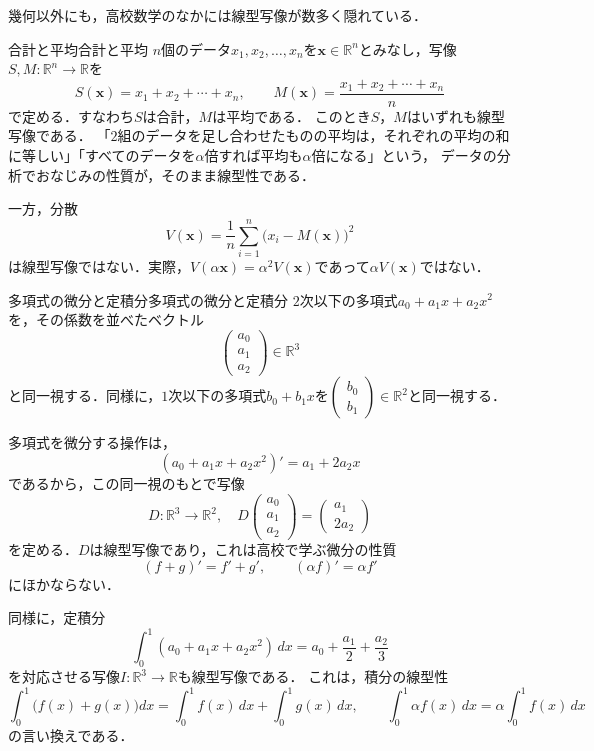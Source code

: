 幾何以外にも，高校数学のなかには線型写像が数多く隠れている．

\begin{example}{合計と平均}{合計と平均}
  $n$個のデータ$x_1, x_2, \dots, x_n$を$\bm{x} \in \mathbb{R}^n$とみなし，写像$S, M \colon \mathbb{R}^n \to \mathbb{R}$を
  \[
    S(\bm{x}) = x_1 + x_2 + \cdots + x_n, \qquad
    M(\bm{x}) = \frac{x_1 + x_2 + \cdots + x_n}{n}
  \]
  で定める．すなわち$S$は合計，$M$は平均である．
  このとき$S$，$M$はいずれも線型写像である．
  「$2$組のデータを足し合わせたものの平均は，それぞれの平均の和に等しい」「すべてのデータを$\alpha$倍すれば平均も$\alpha$倍になる」という，
  データの分析でおなじみの性質が，そのまま線型性である．

  一方，分散
  \[
    V(\bm{x}) = \frac{1}{n}\sum_{i=1}^{n} \bigl(x_i - M(\bm{x})\bigr)^2
  \]
  は線型写像ではない．実際，$V(\alpha\bm{x}) = \alpha^2 V(\bm{x})$であって$\alpha V(\bm{x})$ではない．
\end{example}

\begin{example}{多項式の微分と定積分}{多項式の微分と定積分}
  $2$次以下の多項式$a_0 + a_1 x + a_2 x^2$を，その係数を並べたベクトル
  \[
    \begin{pmatrix} a_0 \\ a_1 \\ a_2 \end{pmatrix} \in \mathbb{R}^3
  \]
  と同一視する．同様に，$1$次以下の多項式$b_0 + b_1 x$を$\begin{pmatrix} b_0 \\ b_1 \end{pmatrix} \in \mathbb{R}^2$と同一視する．

  多項式を微分する操作は，
  \[
    (a_0 + a_1 x + a_2 x^2)' = a_1 + 2a_2 x
  \]
  であるから，この同一視のもとで写像
  \[
    D \colon \mathbb{R}^3 \to \mathbb{R}^2, \quad
    D\begin{pmatrix} a_0 \\ a_1 \\ a_2 \end{pmatrix} = \begin{pmatrix} a_1 \\ 2a_2 \end{pmatrix}
  \]
  を定める．$D$は線型写像であり，これは高校で学ぶ微分の性質
  \[
    (f + g)' = f' + g', \qquad (\alpha f)' = \alpha f'
  \]
  にほかならない．

  同様に，定積分
  \[
    \int_0^1 (a_0 + a_1 x + a_2 x^2)\,dx = a_0 + \frac{a_1}{2} + \frac{a_2}{3}
  \]
  を対応させる写像$I \colon \mathbb{R}^3 \to \mathbb{R}$も線型写像である．
  これは，積分の線型性
  \[
    \int_0^1 \bigl(f(x) + g(x)\bigr) dx = \int_0^1 f(x)\,dx + \int_0^1 g(x)\,dx, \qquad
    \int_0^1 \alpha f(x)\,dx = \alpha \int_0^1 f(x)\,dx
  \]
  の言い換えである．
\end{example}

